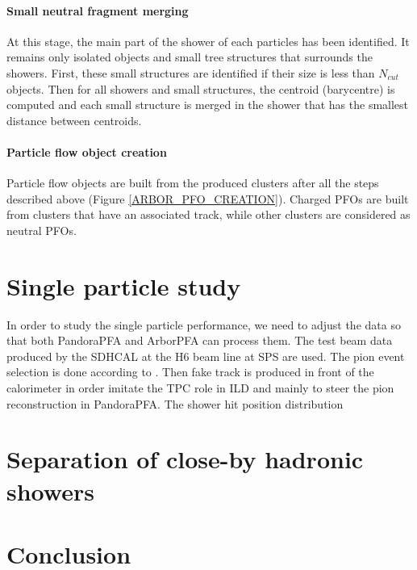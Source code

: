 \documentclass[cits]{JINST}
\begin{document}
\paragraph*{Small neutral fragment merging} At this stage, the main part of the shower of each particles has been identified. It remains only isolated objects and small tree structures that surrounds the showers. First, these small structures are identified if their size is less than $N_{cut}$ objects. Then for all showers and small structures, the centroid (barycentre) is computed and each small structure is merged in the shower that has the smallest distance between centroids.

\paragraph*{Particle flow object creation} Particle flow objects are built from the produced clusters after all the steps described above (Figure \ref{ARBOR_PFO_CREATION}). Charged PFOs are built from clusters that have an associated track, while other clusters are considered as neutral PFOs.

\section{Single particle study}

In order to study the single particle performance, we need to adjust the data so that both PandoraPFA and ArborPFA can process them. The test beam data produced by the SDHCAL at the H6 beam line at SPS are used. The pion event selection is done according to \cite{sdhcal-paper}. Then fake track is produced in front of the calorimeter in order imitate the TPC role in ILD and mainly to steer the pion reconstruction in PandoraPFA. The shower hit position distribution



\section{Separation of close-by hadronic showers}


\section{Conclusion} 
\end{document}
